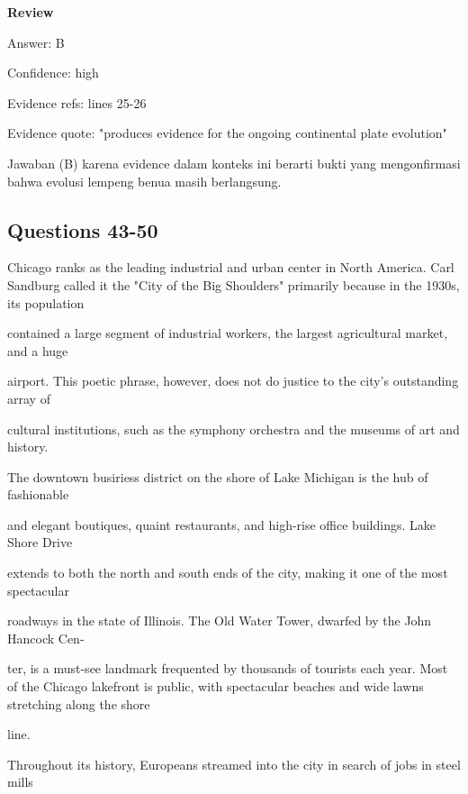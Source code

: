 \documentclass[12pt]{article}
\begin{document}
\par
\begingroup
\setlength{\parskip}{0pt}
\setlength{\parindent}{0pt}
\textbf{Review}\par
Answer: B\par
Confidence: high\par
Evidence refs: lines 25-26\par
Evidence quote: "produces evidence for the ongoing continental plate evolution"\par
Jawaban (B) karena evidence dalam konteks ini berarti bukti yang mengonfirmasi bahwa evolusi lempeng benua masih berlangsung.\par
\endgroup
\par
\vspace{0.25\baselineskip}
\subsection*{Questions 43-50}
\begingroup
\small
\sloppy
\setlength{\parskip}{0pt}
\setlength{\parindent}{0pt}
Chicago ranks as the leading industrial and urban center in North America. Carl Sandburg called it the "City of the Big Shoulders" primarily because in the 1930s, its population\par
contained a large segment of industrial workers, the largest agricultural market, and a huge\par
airport. This poetic phrase, however, does not do justice to the city's outstanding array of\par
cultural institutions, such as the symphony orchestra and the museums of art and history.\par
The downtown busiriess district on the shore of Lake Michigan is the hub of fashionable\par
and elegant boutiques, quaint restaurants, and high-rise office buildings. Lake Shore Drive\par
extends to both the north and south ends of the city, making it one of the most spectacular\par
roadways in the state of Illinois. The Old Water Tower, dwarfed by the John Hancock Cen-\par
ter, is a must-see landmark frequented by thousands of tourists each year. Most of the Chicago lakefront is public, with spectacular beaches and wide lawns stretching along the shore\par
line.\par
Throughout its history, Europeans streamed into the city in search of jobs in steel mills\par
\end{document}
